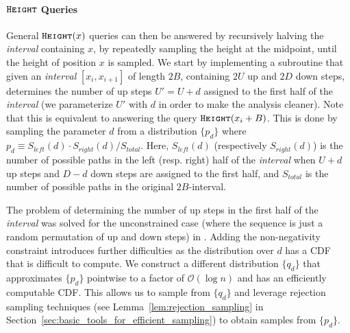 \paragraph*{$\texttt{\textsc{Height}}$ Queries}
\label{par:height_queries}
General $\texttt{\textsc{Height}}(x)$ queries can then be answered by recursively halving the \emph{interval} containing $x$,
by repeatedly sampling the height at the midpoint, until the height of position $x$ is sampled.
We start by implementing a subroutine that given an \emph{interval} $[x_i,x_{i+1}]$ of length $2B$, containing $2U$ up and $2D$ down steps,
determines the number of up steps $U'=U+d$ assigned to the first half of the \emph{interval}
(we parameterize $U'$ with $d$ in order to make the analysis cleaner).
Note that this is equivalent to answering the query $\texttt{\textsc{Height}}(x_i+B)$.
This is done by sampling the parameter $d$ from a distribution $\{ p_d\}$ where $p_d \equiv S_{left}(d)\cdot S_{right}(d)/S_{total}$.
Here, $S_{left}(d)$ (respectively $S_{right}(d)$) is the number of possible paths in the left (resp. right) half of the \emph{interval} when
$U+d$ up steps and $D-d$ down steps are assigned to the first half, and $S_{total}$ is the number of possible paths in the original $2B$-interval.

The problem of determining the number of up steps in the first half of the \emph{interval} was solved for the unconstrained case
(where the sequence is just a random permutation of up and down steps) in \cite{huge}.
Adding the non-negativity constraint introduces further difficulties as the distribution over $d$ has a CDF that is difficult to compute.
We construct a different distribution $\{q_d\}$ that approximates $\{p_d\}$ pointwise to a factor of $\mathcal O(\log n)$
and has an efficiently computable CDF.
This allows us to sample from $\{q_d\}$ and leverage rejection sampling techniques
(see Lemma~\ref{lem:rejection_sampling} in Section~\ref{sec:basic_tools_for_efficient_sampling}) to obtain samples from $\{p_d\}$.

